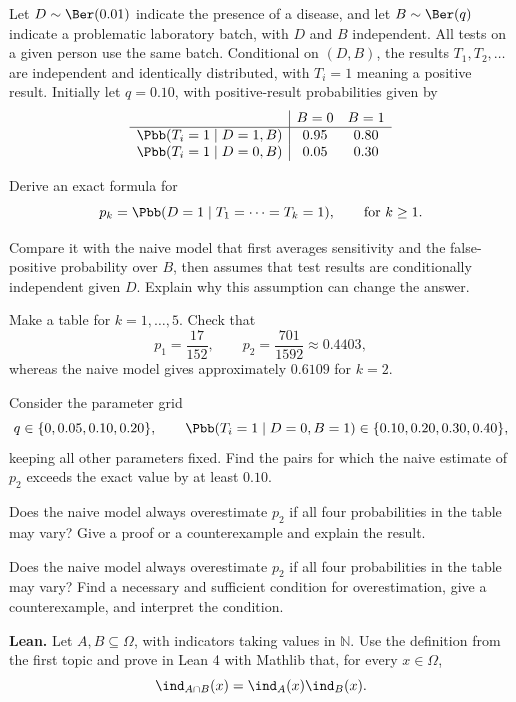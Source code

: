 \begin{researchtask}
Let $D\sim\Ber(0.01)$ indicate the presence of a disease, and let $B\sim\Ber(q)$
indicate a problematic laboratory batch, with $D$ and $B$ independent. All tests
on a given person use the same batch. Conditional on $(D,B)$, the results
$T_1,T_2,\dots$ are independent and identically distributed, with $T_i=1$ meaning a positive result.
Initially let $q=0.10$, with positive-result probabilities given by
\[
\begin{array}{c|cc}
 & B=0 & B=1\\ \hline
\Pbb(T_i=1\mid D=1,B) & 0.95 & 0.80\\
\Pbb(T_i=1\mid D=0,B) & 0.05 & 0.30
\end{array}
\]
\begin{enumeratea}
  \item Derive an exact formula for
  \[ p_k=\Pbb(D=1\mid T_1=\cdots=T_k=1),\qquad\text{for }k\ge1. \]
  \item Compare it with the naive model that first averages sensitivity and the
  false-positive probability over $B$, then assumes that test results are
  conditionally independent given $D$. Explain why this assumption can change the answer.
  \item Make a table for $k=1,\dots,5$. Check that
  \[ p_1=\frac{17}{152},\qquad p_2=\frac{701}{1592}\approx0.4403, \]
  whereas the naive model gives approximately $0.6109$ for $k=2$.
  \item Consider the parameter grid
  \[
  q\in\{0,0.05,0.10,0.20\},\qquad
  \Pbb(T_i=1\mid D=0,B=1)\in\{0.10,0.20,0.30,0.40\},
  \]
  keeping all other parameters fixed. Find the pairs for which the naive estimate
  of $p_2$ exceeds the exact value by at least $0.10$.
  \item Does the naive model always overestimate $p_2$ if all four probabilities
  in the table may vary? Give a proof or a counterexample and explain the result.
  \item Does the naive model always overestimate $p_2$ if all four probabilities
  in the table may vary? Find a necessary and sufficient condition for overestimation,
  give a counterexample, and interpret the condition.
\end{enumeratea}
\end{researchtask}
\noindent\textbf{Lean.} Let $A,B\subseteq\Omega$, with indicators taking values
in $\mathbb N$. Use the definition from the first topic and prove in Lean 4 with
Mathlib that, for every $x\in\Omega$,
\[ \ind_{A\cap B}(x)=\ind_A(x)\ind_B(x). \]
